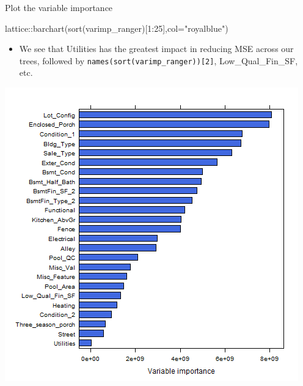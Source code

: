 \documentclass[
  10pt,
  ignorenonframetext,
]{beamer}
\newenvironment{Shaded}{}{}
\newcommand{\DataTypeTok}[1]{#1}
\newcommand{\DecValTok}[1]{#1}
\newcommand{\KeywordTok}[1]{\textcolor[rgb]{0.00,0.00,1.00}{#1}}
\newcommand{\NormalTok}[1]{#1}
\newcommand{\OperatorTok}[1]{#1}
\newcommand{\StringTok}[1]{\textcolor[rgb]{0.00,0.50,0.50}{#1}}
\providecommand{\tightlist}{%
  \setlength{\itemsep}{0pt}\setlength{\parskip}{0pt}}
\begin{document}
\begin{frame}[fragile]{Plot the variable importance}
\protect\hypertarget{plot-the-variable-importance}{}

\begin{Shaded}
\end{Shaded}

\begin{Shaded}
\begin{Highlighting}[]
\NormalTok{lattice}\OperatorTok{::}\KeywordTok{barchart}\NormalTok{(}\KeywordTok{sort}\NormalTok{(varimp_ranger)[}\DecValTok{1}\OperatorTok{:}\DecValTok{25}\NormalTok{],}\DataTypeTok{col=}\StringTok{"royalblue"}\NormalTok{)}
\end{Highlighting}
\end{Shaded}

\begin{itemize}
\tightlist
\item
  We see that Utilities has the greatest impact in reducing MSE across
  our trees, followed by \texttt{names(sort(varimp\_ranger)){[}2{]}},
  Low\_Qual\_Fin\_SF, etc.
\end{itemize}

\includegraphics[width=\textwidth,height=0.6\textheight]{figure/ml_rf_varimp_ranger.png}

\end{frame}
\end{document}
